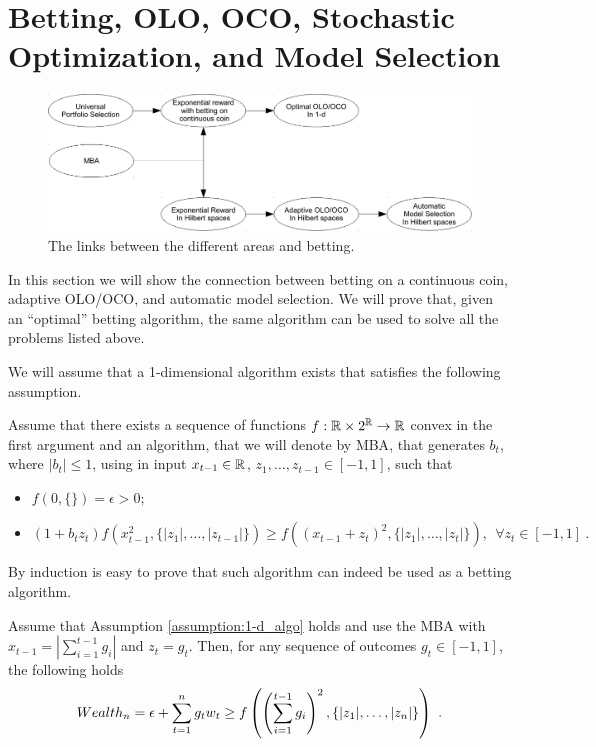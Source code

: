 \section{Betting, OLO, OCO, Stochastic Optimization, and Model Selection}
\label{sec:appl}

\begin{figure}[t]
\centering
\includegraphics[width=.95\linewidth]{./figs/links_between_areas.pdf}
\caption{The links between the different areas and betting.}
\end{figure}

In this section we will show the connection between betting on a continuous coin, adaptive \ac{OLO}/\ac{OCO}, and automatic model selection. We will prove that, given an ``optimal'' betting algorithm, the same algorithm can be used to solve all the problems listed above.

We will assume that a 1-dimensional algorithm exists that satisfies the following assumption.
\begin{assumption}
\label{assumption:1-d_algo}
Assume that there exists a sequence of functions $f:\mathbb{R} \times 2^{\mathbb{R}} \rightarrow \mathbb{R}$ convex in the first argument and an algorithm, that we will denote by \ac{MBA}, that generates $b_t$, where $|b_t|\leq 1$, using in input $x_{t-1} \in \mathbb{R}$, $z_1, \ldots, z_{t-1} \in [-1,1]$, such that
\begin{itemize}
\item $f(0,\{\})=\epsilon>0$;
\item  \begin{equation}
\label{eq:1_d_hp}
(1+b_t z_t) f\left( x_{t-1}^2, \{|z_1|, \ldots, |z_{t-1}|\} \right) \geq f\left( (x_{t-1}+z_t)^2, \{|z_1|, \ldots, |z_t|\}\right), \ \ \forall z_{t} \in [-1,1]~.
\end{equation}
\end{itemize}
\end{assumption}

By induction is easy to prove that such algorithm can indeed be used as a betting algorithm. 
\begin{theorem}
\label{theo:1-d_reward}
Assume that Assumption \ref{assumption:1-d_algo} holds and use the \ac{MBA} with $x_{t-1}=|\sum_{i=1}^{t-1} g_i|$ and $z_t=g_t$.
Then, for any sequence of outcomes $g_t \in [-1,1]$, the following holds
\[
Wealth_n = \epsilon+\sum_{t=1}^n g_t w_t \geq f\left( \left(\sum_{i=1}^{t-1} g_i \right)^2, \left\{|z_1|, \ldots, |z_n|\right\}\right)~.
\]
\end{theorem}

